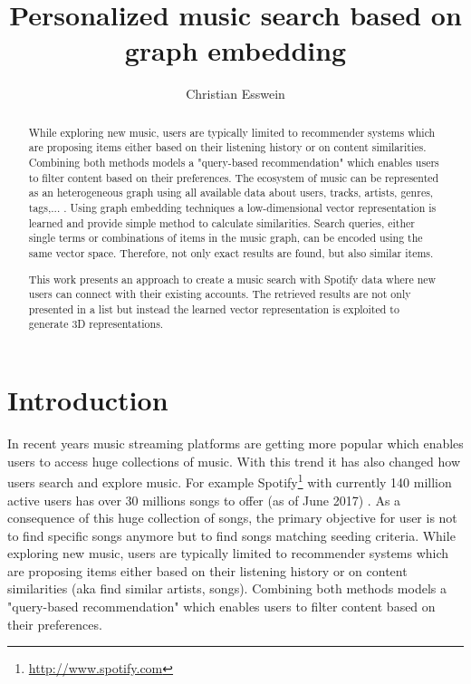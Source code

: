 \documentclass[sigconf]{acmart}
\begin{document}
\title{Personalized music search based on graph embedding}


\author{Christian Esswein}


\begin{abstract}
	While exploring new music, users are typically limited to recommender systems which are proposing items either based on their listening history or on content similarities. Combining both methods models a "query-based recommendation" which enables users to filter content based on their preferences.
	The ecosystem of music can be represented as an heterogeneous graph using all available data about users, tracks, artists, genres, tags,... . Using graph embedding techniques a low-dimensional vector representation is learned and provide simple method to calculate similarities. Search queries, either single terms or combinations of items in the music graph, can be encoded using the same vector space. Therefore, not only exact results are found, but also similar items.
	
	This work presents an approach to create a music search with Spotify data where new users can connect with their existing accounts. The retrieved results are not only presented in a list but instead the learned vector representation is exploited to generate 3D representations.
\end{abstract}



\maketitle

\section{Introduction}
In recent years music streaming platforms are getting more popular which enables users to access huge collections of music. With this trend it has also changed how users search and explore music\cite{lee2016look}. For example Spotify\footnote{\url{http://www.spotify.com}} with currently 140 million active users has over 30 millions songs to offer (as of June 2017)	\cite{aboutSpotify}. As a consequence of this huge collection of songs, the primary objective for user is not to find specific songs anymore but to find songs matching seeding criteria. 
While exploring new music, users are typically limited to recommender systems which are proposing items either based on their listening history or on content similarities (aka find similar artists, songs). Combining both methods models a "query-based recommendation" which enables users to filter content based on their preferences.
\end{document}
